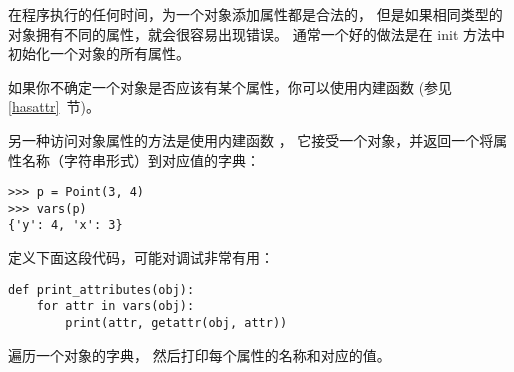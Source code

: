 
在程序执行的任何时间，为一个对象添加属性都是合法的，
但是如果相同类型的对象拥有不同的属性，就会很容易出现错误。
通常一个好的做法是在 init 方法中初始化一个对象的所有属性。

  


如果你不确定一个对象是否应该有某个属性，你可以使用内建函数 
 (参见 \ref{hasattr}~节)。

  


另一种访问对象属性的方法是使用内建函数 ，
它接受一个对象，并返回一个将属性名称（字符串形式）到对应值的字典：

\begin{lstlisting}
>>> p = Point(3, 4)
>>> vars(p)
{'y': 4, 'x': 3}
\end{lstlisting}

%

定义下面这段代码，可能对调试非常有用：

\begin{lstlisting}
def print_attributes(obj):
    for attr in vars(obj):
        print(attr, getattr(obj, attr))
\end{lstlisting}

%

 遍历一个对象的字典，
然后打印每个属性的名称和对应的值。

  


